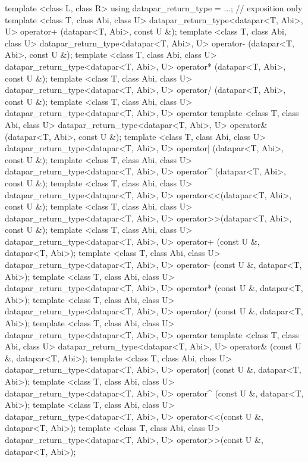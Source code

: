 \begin{itemdecl}
template <class L, class R> using datapar_return_type = ...;  // exposition only
template <class T, class Abi, class U>
datapar_return_type<datapar<T, Abi>, U> operator+ (datapar<T, Abi>, const U &);
template <class T, class Abi, class U>
datapar_return_type<datapar<T, Abi>, U> operator- (datapar<T, Abi>, const U &);
template <class T, class Abi, class U>
datapar_return_type<datapar<T, Abi>, U> operator* (datapar<T, Abi>, const U &);
template <class T, class Abi, class U>
datapar_return_type<datapar<T, Abi>, U> operator/ (datapar<T, Abi>, const U &);
template <class T, class Abi, class U>
datapar_return_type<datapar<T, Abi>, U> operator%
template <class T, class Abi, class U>
datapar_return_type<datapar<T, Abi>, U> operator& (datapar<T, Abi>, const U &);
template <class T, class Abi, class U>
datapar_return_type<datapar<T, Abi>, U> operator| (datapar<T, Abi>, const U &);
template <class T, class Abi, class U>
datapar_return_type<datapar<T, Abi>, U> operator^ (datapar<T, Abi>, const U &);
template <class T, class Abi, class U>
datapar_return_type<datapar<T, Abi>, U> operator<<(datapar<T, Abi>, const U &);
template <class T, class Abi, class U>
datapar_return_type<datapar<T, Abi>, U> operator>>(datapar<T, Abi>, const U &);
template <class T, class Abi, class U>
datapar_return_type<datapar<T, Abi>, U> operator+ (const U &, datapar<T, Abi>);
template <class T, class Abi, class U>
datapar_return_type<datapar<T, Abi>, U> operator- (const U &, datapar<T, Abi>);
template <class T, class Abi, class U>
datapar_return_type<datapar<T, Abi>, U> operator* (const U &, datapar<T, Abi>);
template <class T, class Abi, class U>
datapar_return_type<datapar<T, Abi>, U> operator/ (const U &, datapar<T, Abi>);
template <class T, class Abi, class U>
datapar_return_type<datapar<T, Abi>, U> operator%
template <class T, class Abi, class U>
datapar_return_type<datapar<T, Abi>, U> operator& (const U &, datapar<T, Abi>);
template <class T, class Abi, class U>
datapar_return_type<datapar<T, Abi>, U> operator| (const U &, datapar<T, Abi>);
template <class T, class Abi, class U>
datapar_return_type<datapar<T, Abi>, U> operator^ (const U &, datapar<T, Abi>);
template <class T, class Abi, class U>
datapar_return_type<datapar<T, Abi>, U> operator<<(const U &, datapar<T, Abi>);
template <class T, class Abi, class U>
datapar_return_type<datapar<T, Abi>, U> operator>>(const U &, datapar<T, Abi>);
\end{itemdecl}
